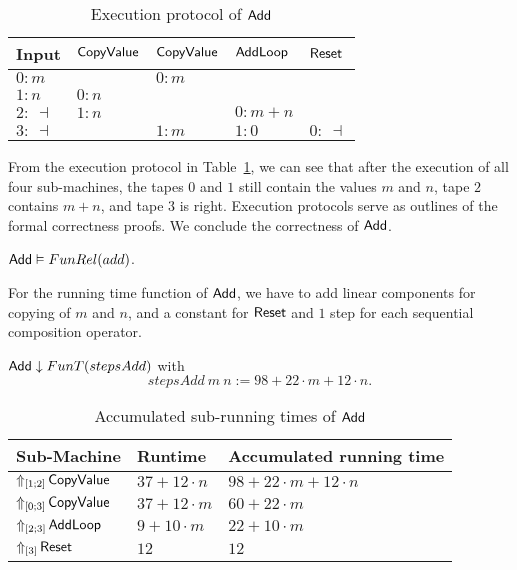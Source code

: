 \begin{table}[h]
  \centering
  \begin{tabular}{l||l|l|l|l}
    Input       & $\MS{CopyValue}$ & $\MS{CopyValue}$ & $\MS{AddLoop}$ & $\MS{Reset}$ \\ \hline
    $0: m$      &                  & $0 : m$          &                &              \\
    $1: n$      & $0 : n$          &                  &                &              \\
    $2:~\dashv$ & $1 : n$          &                  & $0: m+n$       &              \\
    $3:~\dashv$ &                  & $1 : m$          & $1: 0$         & $0:~ \dashv$ \\
  \end{tabular}
  \caption{Execution protocol of $\MS{Add}$}
  \label{tab:exec-Add}
\end{table}

From the execution protocol in Table~\ref{tab:exec-Add}, we can see that after the execution of all four sub-machines, the tapes $0$ and $1$ still
contain the values $m$ and $n$, tape $2$ contains $m+n$, and tape $3$ is right.  Execution protocols serve as outlines of the formal correctness
proofs.  We conclude the correctness of $\MS{Add}$.
\begin{lemma}
  \label{lem:Add_Computes}
  $\MS{Add} \Realise FunRel(add)$.
\end{lemma}

For the running time function of $\MS{Add}$, we have to add linear components for copying of $m$ and $n$, and a constant for $\MS{Reset}$ and $1$ step for
each sequential composition operator.
\begin{lemma}
  $\MS{Add} \downarrow FunT(stepsAdd)$ with
  \[
    stepsAdd~m~n := 98 + 22 \cdot m + 12 \cdot n.
  \]
\end{lemma}

\begin{table}[h]
  \centering
  \begin{tabular}{l|l|l}
    Sub-Machine & Runtime & Accumulated running time \\ \hline
    $\LiftTapes{\MS{CopyValue}}{\Vector{1;2}}$  & $37 + 12 \cdot n$ & $98 + 22 \cdot m + 12 \cdot n$ \\
    $\LiftTapes{\MS{CopyValue}}{\Vector{0;3}}$  & $37 + 12 \cdot m$ & $60 + 22 \cdot m$ \\
    $\LiftTapes{\MS{AddLoop}}{\Vector{2;3}}$    & $9 + 10 \cdot m$  & $22 + 10 \cdot m$ \\
    $\LiftTapes{\MS{Reset}}{\Vector{3}}$        & $12$              & $12$ \\
  \end{tabular}
  \caption{Accumulated sub-running times of $\MS{Add}$}
  \label{tab:runningtime-Add}
\end{table}

